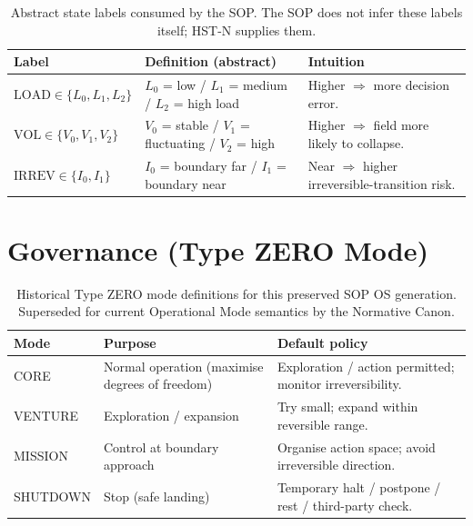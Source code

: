 \begin{table}[ht]
\centering
\small
\begin{tabularx}{\linewidth}{lXX}
\toprule
\textbf{Label} & \textbf{Definition (abstract)} & \textbf{Intuition} \\
\midrule
$\mathrm{LOAD} \in \{L_0, L_1, L_2\}$
& $L_0$ = low / $L_1$ = medium / $L_2$ = high load
& Higher $\Rightarrow$ more decision error. \\

$\mathrm{VOL} \in \{V_0, V_1, V_2\}$
& $V_0$ = stable / $V_1$ = fluctuating / $V_2$ = high
& Higher $\Rightarrow$ field more likely to collapse. \\

$\mathrm{IRREV} \in \{I_0, I_1\}$
& $I_0$ = boundary far / $I_1$ = boundary near
& Near $\Rightarrow$ higher irreversible-transition risk. \\
\bottomrule
\end{tabularx}
\caption[SOP OS state labels]{Abstract state labels consumed by the
SOP. The SOP does not infer these labels itself; HST-N supplies
them.}
\label{tab:sop-os-state-labels}
\end{table}

\section{Governance (Type ZERO Mode)}
\label{sec:sop-os-governance}

\begin{table}[ht]
\centering
\small
\begin{tabularx}{\linewidth}{lXX}
\toprule
\textbf{Mode} & \textbf{Purpose} & \textbf{Default policy} \\
\midrule
CORE
& Normal operation (maximise degrees of freedom)
& Exploration / action permitted; monitor irreversibility. \\

VENTURE
& Exploration / expansion
& Try small; expand within reversible range. \\

MISSION
& Control at boundary approach
& Organise action space; avoid irreversible direction. \\

SHUTDOWN
& Stop (safe landing)
& Temporary halt / postpone / rest / third-party check. \\
\bottomrule
\end{tabularx}
\caption[Historical SOP OS mode definitions]{Historical Type ZERO mode
definitions for this preserved SOP OS generation. Superseded for current
Operational Mode semantics by the Normative Canon.}
\label{tab:sop-os-modes}
\end{table}

